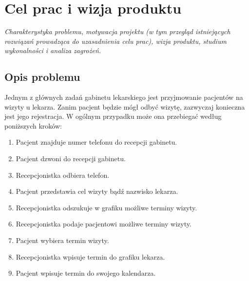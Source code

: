 \documentclass[polish,12pt]{aghthesis}
\author{Wojciech Karpiel\\ Michał Hamuda\\ Filip Galas}
\date{2017}
\begin{document}
\maketitle

\tableofcontents

\section{Cel prac i wizja produktu}
\label{sec:cel-wizja}
\emph{Charakterystyka problemu, motywacja projektu (w tym przegląd
  istniejących rozwiązań prowadząca do uzasadnienia celu prac),
  wizja produktu, studium wykonalności i analiza zagrożeń.}
  
\subsection{Opis problemu}
Jednym z głównych zadań gabinetu lekarskiego jest przyjmowanie pacjentów na wizyty u lekarza. Zanim pacjent będzie mógł odbyć wizytę, zazwyczaj konieczna jest jego rejestracja. W ogólnym przypadku może ona przebiegać według poniższych kroków:

\begin{enumerate}
  \item Pacjent znajduje numer telefonu do recepcji gabinetu.
  \item Pacjent dzwoni do recepcji gabinetu.
  \item Recepcjonistka odbiera telefon.
  \item Pacjent przedstawia cel wizyty bądź nazwisko lekarza.
  \item Recepcjonistka odszukuje w grafiku możliwe terminy wizyty.
  \item Recepcjonistka podaje pacjentowi możliwe terminy wizyty.
  \item Pacjent wybiera termin wizyty.
  \item Recepcjonistka wpisuje termin do grafiku lekarza.
  \item Pacjent wpisuje termin do swojego kalendarza.
\end{enumerate}
\end{document}

